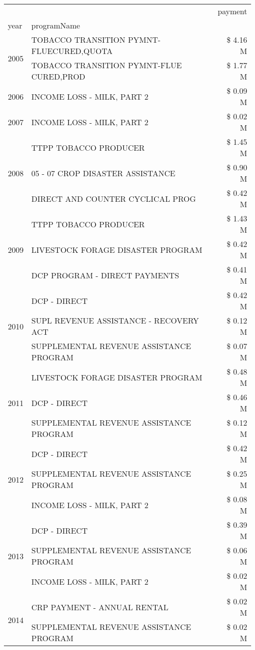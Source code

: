 \begin{tabular}{llr}
\toprule
 &  & payment \\
year & programName &  \\
\midrule
\multirow[t]{2}{*}{2005} & TOBACCO TRANSITION PYMNT-FLUECURED,QUOTA & \$ 4.16 M \\
 & TOBACCO TRANSITION PYMNT-FLUE CURED,PROD & \$ 1.77 M \\
\cline{1-3}
2006 & INCOME LOSS - MILK, PART 2 & \$ 0.09 M \\
\cline{1-3}
2007 & INCOME LOSS - MILK, PART 2 & \$ 0.02 M \\
\cline{1-3}
\multirow[t]{3}{*}{2008} & TTPP TOBACCO PRODUCER & \$ 1.45 M \\
 & 05 - 07 CROP DISASTER ASSISTANCE & \$ 0.90 M \\
 & DIRECT AND COUNTER CYCLICAL PROG & \$ 0.42 M \\
\cline{1-3}
\multirow[t]{3}{*}{2009} & TTPP TOBACCO PRODUCER & \$ 1.43 M \\
 & LIVESTOCK FORAGE DISASTER  PROGRAM & \$ 0.42 M \\
 & DCP PROGRAM - DIRECT PAYMENTS & \$ 0.41 M \\
\cline{1-3}
\multirow[t]{3}{*}{2010} & DCP - DIRECT & \$ 0.42 M \\
 & SUPL REVENUE ASSISTANCE - RECOVERY ACT & \$ 0.12 M \\
 & SUPPLEMENTAL REVENUE ASSISTANCE PROGRAM & \$ 0.07 M \\
\cline{1-3}
\multirow[t]{3}{*}{2011} & LIVESTOCK FORAGE DISASTER PROGRAM & \$ 0.48 M \\
 & DCP - DIRECT & \$ 0.46 M \\
 & SUPPLEMENTAL REVENUE ASSISTANCE PROGRAM & \$ 0.12 M \\
\cline{1-3}
\multirow[t]{3}{*}{2012} & DCP - DIRECT & \$ 0.42 M \\
 & SUPPLEMENTAL REVENUE ASSISTANCE PROGRAM & \$ 0.25 M \\
 & INCOME LOSS - MILK, PART 2 & \$ 0.08 M \\
\cline{1-3}
\multirow[t]{3}{*}{2013} & DCP - DIRECT & \$ 0.39 M \\
 & SUPPLEMENTAL REVENUE ASSISTANCE PROGRAM & \$ 0.06 M \\
 & INCOME LOSS - MILK, PART 2 & \$ 0.02 M \\
\cline{1-3}
\multirow[t]{3}{*}{2014} & CRP PAYMENT - ANNUAL RENTAL & \$ 0.02 M \\
 & SUPPLEMENTAL REVENUE ASSISTANCE PROGRAM & \$ 0.02 M \\

\end{tabular}
